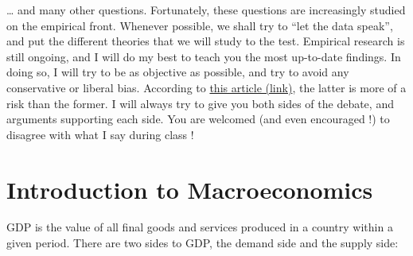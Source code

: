 \documentclass[]{book}
\theoremstyle{definition}
\theoremstyle{definition}
\theoremstyle{definition}
\theoremstyle{remark}
\begin{document}
\ldots{} and many other questions. Fortunately, these questions are
increasingly studied on the empirical front. Whenever possible, we shall
try to ``let the data speak'', and put the different theories that we
will study to the test. Empirical research is still ongoing, and I will
do my best to teach you the most up-to-date findings. In doing so, I
will try to be as objective as possible, and try to avoid any
conservative or liberal bias. According to
\href{https://www.bloomberg.com/view/articles/2018-09-17/colleges-have-way-too-many-liberal-professors}{this
article (link)}, the latter is more of a risk than the former. I will
always try to give you both sides of the debate, and arguments
supporting each side. You are welcomed (and even encouraged !) to
disagree with what I say during class !

\hypertarget{intro-cobb}{\chapter{Introduction to
Macroeconomics}\label{intro-cobb}}

GDP is the value of all final goods and services produced in a country
within a given period. There are two sides to GDP, the demand side and
the supply side:
\end{document}
